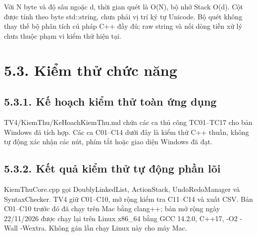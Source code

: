 Với N byte và độ sâu ngoặc d, thời gian quét là O(N), bộ nhớ Stack O(d).
Cột được tính theo byte std::string, chưa phải vị trí ký tự Unicode. Bộ
quét không thay thế bộ phân tích cú pháp C++ đầy đủ; raw string và nối
dòng tiền xử lý chưa thuộc phạm vi kiểm thử hiện tại.


\section{5.3. Kiểm thử chức
năng}\label{tv4-22-5-3-kiux1ec3m-thux1eed-chux1ee9c-nux103ng}

\subsection{5.3.1. Kế hoạch kiểm thử toàn ứng
dụng}\label{tv4-22-5-3-kux1ebf-houx1ea1ch-kiux1ec3m-thux1eed-touxe0n-ux1ee9ng-dux1ee5ng}

TV4/KiemThu/KeHoachKiemThu.md chứa các ca thủ công TC01--TC17 cho bản
Windows đã tích hợp. Các ca C01--C14 dưới đây là kiểm thử C++ thuần,
không tự động xác nhận các nút, phím tắt hoặc giao diện Windows đã đạt.

\subsection{5.3.2. Kết quả kiểm thử tự động phần
lõi}\label{tv4-22-5-3-kux1ebft-quux1ea3-kiux1ec3m-thux1eed-tux1ef1-ux111ux1ed9ng-phux1ea7n-luxf5i}

KiemThuCore.cpp gọi DoublyLinkedList, ActionStack, UndoRedoManager và
SyntaxChecker. TV4 giữ C01--C10, mở rộng kiểm tra C11--C14 và xuất CSV.
Bản C01--C10 trước đó đã chạy trên Mac bằng clang++; bản mở rộng ngày
22/11/2026 được chạy lại trên Linux x86\_64 bằng GCC 14.2.0, C++17, -O2
-Wall -Wextra. Không gán lần chạy Linux này cho máy Mac.

